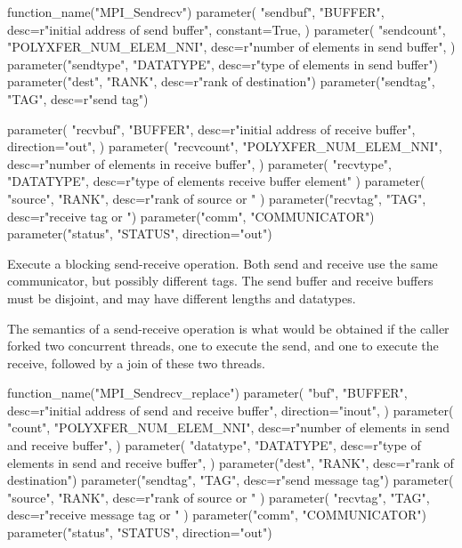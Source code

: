 \begin{mpi-binding}
    function_name("MPI_Sendrecv")
    parameter(
        "sendbuf",
        "BUFFER",
        desc=r"initial address of send buffer",
        constant=True,
    )
    parameter(
        "sendcount",
        "POLYXFER_NUM_ELEM_NNI",
        desc=r"number of elements in send buffer",
    )
    parameter("sendtype", "DATATYPE", desc=r"type of elements in send buffer")
    parameter("dest", "RANK", desc=r"rank of destination")
    parameter("sendtag", "TAG", desc=r"send tag")

    parameter(
        "recvbuf",
        "BUFFER",
        desc=r"initial address of receive buffer",
        direction="out",
    )
    parameter(
        "recvcount",
        "POLYXFER_NUM_ELEM_NNI",
        desc=r"number of elements in receive buffer",
    )
    parameter(
        "recvtype", "DATATYPE", desc=r"type of elements receive buffer element"
    )
    parameter(
        "source", "RANK", desc=r"rank of source or "
    )
    parameter("recvtag", "TAG", desc=r"receive tag or ")
    parameter("comm", "COMMUNICATOR")
    parameter("status", "STATUS", direction="out")
\end{mpi-binding}

Execute a blocking send-receive operation.  Both send and receive
use the same communicator, but
possibly different tags.  The send buffer and receive buffers must be
disjoint, and may have different lengths and datatypes.

The semantics of a send-receive operation is what would be obtained
if the caller forked two concurrent threads, one to execute the send,
and one to execute the receive, followed by a join of these two
threads.

\begin{mpi-binding}
    function_name("MPI_Sendrecv_replace")
    parameter(
        "buf",
        "BUFFER",
        desc=r"initial address of send and receive buffer",
        direction="inout",
    )
    parameter(
        "count",
        "POLYXFER_NUM_ELEM_NNI",
        desc=r"number of elements in send and receive buffer",
    )
    parameter(
        "datatype",
        "DATATYPE",
        desc=r"type of elements in send and receive buffer",
    )
    parameter("dest", "RANK", desc=r"rank of destination")
    parameter("sendtag", "TAG", desc=r"send message tag")
    parameter(
        "source", "RANK", desc=r"rank of source or "
    )
    parameter(
        "recvtag", "TAG", desc=r"receive message tag or "
    )
    parameter("comm", "COMMUNICATOR")
    parameter("status", "STATUS", direction="out")
\end{mpi-binding}

